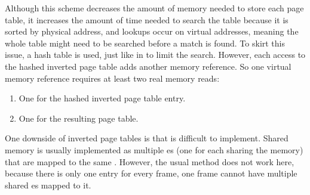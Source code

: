 Although this scheme decreases the amount of memory needed to store each page table, it increases the amount of time needed to search the table because it is sorted by physical address, and lookups occur on virtual addresses, meaning the whole table might need to be searched before a match is found.
To skirt this issue, a hash table is used, just like in  to limit the search.
However, each access to the hashed inverted page table adds another memory reference.
So one virtual memory reference requires at least two real memory reads:
\begin{enumerate}[noitemsep]
\item One for the hashed inverted page table entry.
\item One for the resulting page table.
\end{enumerate}

One downside of inverted page tables is that  is difficult to implement.
Shared memory is usually implemented as multiple es (one for each  sharing the memory) that are mapped to the same .
However, the usual method does not work here, because there is only one entry for every frame, one frame cannot have multiple shared es mapped to it.

